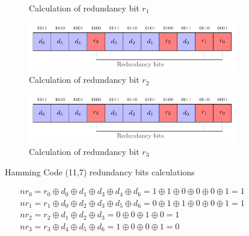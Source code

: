 \begin{figure}[ht]
\begin{subfigure}[b]{0.49\textwidth}
        \caption{Calculation of redundancy bit $r_1$}
        \label{fig:hamming_code_example_3}
    \end{subfigure}
    \hfill
    \begin{subfigure}[b]{0.49\textwidth}
        \includegraphics[width=\textwidth, page=8]{c5_countermeasures_dift/img/hamming_bit.pdf}
        \caption{Calculation of redundancy bit $r_2$}
        \label{fig:hamming_code_example_4}
    \end{subfigure}
    \hfill
    \begin{subfigure}[b]{0.49\textwidth}
        \includegraphics[width=\textwidth, page=10]{c5_countermeasures_dift/img/hamming_bit.pdf}
        \caption{Calculation of redundancy bit $r_3$}
        \label{fig:hamming_code_example_5}
    \end{subfigure}
    \caption{Hamming Code (11,7) redundancy bits calculations}
    \label{fig:hamming_code_example}
\end{figure}

\begin{equation} \label{equat:hamming_decoder}
    \begin{split}
        nr_{0} = r_{0} \oplus d_{0} \oplus d_{1} \oplus d_{3} \oplus d_{4} \oplus d_{6} = 1 \oplus 1 \oplus 0 \oplus 0 \oplus 0 \oplus 1    = 1 \\
        nr_{1} = r_{1} \oplus d_{0} \oplus d_{2} \oplus d_{3} \oplus d_{5} \oplus d_{6} = 0 \oplus 1 \oplus 1 \oplus 0 \oplus 0 \oplus 1    = 1 \\
        nr_{2} = r_{2} \oplus d_{1} \oplus d_{2} \oplus d_{3}                           = 0 \oplus 0 \oplus 1 \oplus 0                      = 1 \\
        nr_{3} = r_{3} \oplus d_{4} \oplus d_{5} \oplus d_{6}                           = 1 \oplus 0 \oplus 0 \oplus 1                      = 0
    \end{split}
\end{equation}

